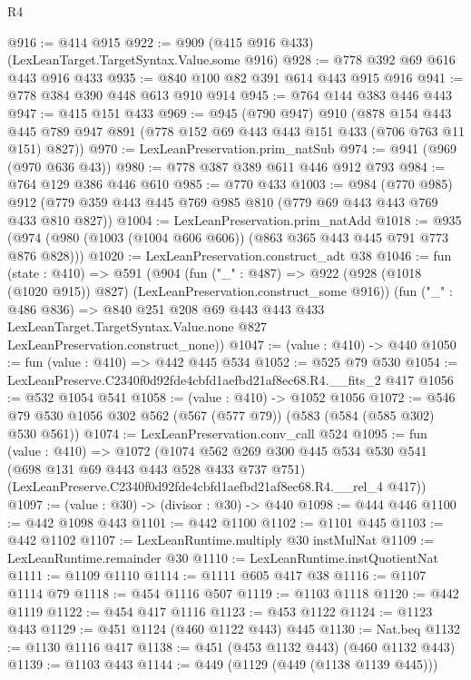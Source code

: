\begin{lexlean}{R4}
\begin{coremodule}
@916 := @414 @915
@922 := @909 (@415 @916 @433) (LexLeanTarget.TargetSyntax.Value.some @916)
@928 := @778 @392 @69 @616 @443 @916 @433
@935 := @840 @100 @82 @391 @614 @443 @915 @916
@941 := @778 @384 @390 @448 @613 @910 @914
@945 := @764 @144 @383 @446 @443
@947 := @415 @151 @433
@969 := @945
    (@790 @947)
    @910
    (@878
      @154
      @443
      @445
      @789
      @947
      @891
      (@778 @152 @69 @443 @443 @151 @433 (@706 @763 @11 @151) @827))
@970 := LexLeanPreservation.prim_natSub
@974 := @941 (@969 (@970 @636 @43))
@980 := @778 @387 @389 @611 @446 @912 @793
@984 := @764 @129 @386 @446 @610
@985 := @770 @433
@1003 := @984
    (@770 @985)
    @912
    (@779 @359 @443 @445 @769 @985 @810 (@779 @69 @443 @443 @769 @433 @810 @827))
@1004 := LexLeanPreservation.prim_natAdd
@1018 := @935 (@974 (@980 (@1003 (@1004 @606 @606)) (@863 @365 @443 @445 @791 @773 @876 @828)))
@1020 := LexLeanPreservation.construct_adt @38
@1046 := fun (state : @410) =>
  @591
    (@904
      (fun ("_" : @487) =>
      @922 (@928 (@1018 (@1020 @915)) @827) (LexLeanPreservation.construct_some @916))
      (fun ("_" : @486 @836) =>
      @840
        @251
        @208
        @69
        @443
        @443
        @433
        LexLeanTarget.TargetSyntax.Value.none
        @827
        LexLeanPreservation.construct_none))
@1047 := (value : @410) -> @440
@1050 := fun (value : @410) => @442 @445 @534
@1052 := @525 @79 @530
@1054 := LexLeanPreserve.C2340f0d92fde4cbfd1aefbd21af8ec68.R4.__fits_2 @417
@1056 := @532 @1054 @541
@1058 := (value : @410) -> @1052 @1056
@1072 := @546 @79 @530 @1056 @302 @562 (@567 (@577 @79)) (@583 (@584 (@585 @302) @530 @561))
@1074 := LexLeanPreservation.conv_call @524
@1095 := fun (value : @410) =>
  @1072
    (@1074
      @562
      @269
      @300
      @445
      @534
      @530
      @541
      (@698 @131 @69 @443 @443 @528 @433 @737 @751)
      (LexLeanPreserve.C2340f0d92fde4cbfd1aefbd21af8ec68.R4.__rel_4 @417))
@1097 := (value : @30) -> (divisor : @30) -> @440
@1098 := @444 @446
@1100 := @442 @1098 @443
@1101 := @442 @1100
@1102 := @1101 @445
@1103 := @442 @1102
@1107 := LexLeanRuntime.multiply @30 instMulNat
@1109 := LexLeanRuntime.remainder @30
@1110 := LexLeanRuntime.instQuotientNat
@1111 := @1109 @1110
@1114 := @1111 @605 @417 @38
@1116 := @1107 @1114 @79
@1118 := @454 @1116 @507
@1119 := @1103 @1118
@1120 := @442 @1119
@1122 := @454 @417 @1116
@1123 := @453 @1122
@1124 := @1123 @443
@1129 := @451 @1124 (@460 @1122 @443) @445
@1130 := Nat.beq
@1132 := @1130 @1116 @417
@1138 := @451 (@453 @1132 @443) (@460 @1132 @443)
@1139 := @1103 @443
@1144 := @449 (@1129 (@449 (@1138 @1139 @445)))

\end{coremodule}
\end{lexlean}
